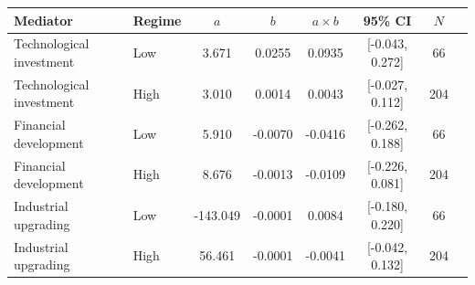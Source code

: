 \begin{tabular}{llcccccc}
\toprule
Mediator & Regime & $a$ & $b$ & $a\times b$ & 95\% CI & $N$ \\
\midrule
Technological investment & Low & 3.671 & 0.0255 & 0.0935 & [-0.043, 0.272] & 66 \\
Technological investment & High & 3.010 & 0.0014 & 0.0043 & [-0.027, 0.112] & 204 \\
\midrule
Financial development & Low & 5.910 & -0.0070 & -0.0416 & [-0.262, 0.188] & 66 \\
Financial development & High & 8.676 & -0.0013 & -0.0109 & [-0.226, 0.081] & 204 \\
\midrule
Industrial upgrading & Low & -143.049 & -0.0001 & 0.0084 & [-0.180, 0.220] & 66 \\
Industrial upgrading & High & 56.461 & -0.0001 & -0.0041 & [-0.042, 0.132] & 204 \\
\bottomrule
\end{tabular}